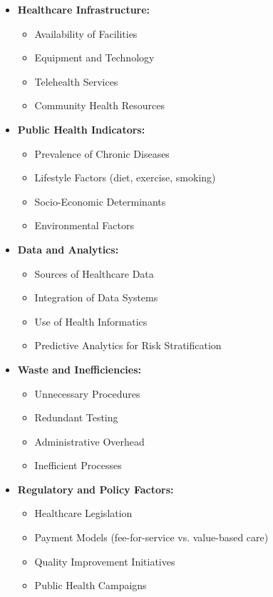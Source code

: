 \documentclass{article}
\begin{document}
\begin{itemize}
    \item \textbf{Healthcare Infrastructure:}
    \begin{itemize}
        \item Availability of Facilities
        \item Equipment and Technology
        \item Telehealth Services
        \item Community Health Resources
    \end{itemize}
    
    \item \textbf{Public Health Indicators:}
    \begin{itemize}
        \item Prevalence of Chronic Diseases
        \item Lifestyle Factors (diet, exercise, smoking)
        \item Socio-Economic Determinants
        \item Environmental Factors
    \end{itemize}
    
    \item \textbf{Data and Analytics:}
    \begin{itemize}
        \item Sources of Healthcare Data
        \item Integration of Data Systems
        \item Use of Health Informatics
        \item Predictive Analytics for Risk Stratification
    \end{itemize}
    
    \item \textbf{Waste and Inefficiencies:}
    \begin{itemize}
        \item Unnecessary Procedures
        \item Redundant Testing
        \item Administrative Overhead
        \item Inefficient Processes
    \end{itemize}
    
    \item \textbf{Regulatory and Policy Factors:}
    \begin{itemize}
        \item Healthcare Legislation
        \item Payment Models (fee-for-service vs. value-based care)
        \item Quality Improvement Initiatives
        \item Public Health Campaigns
    \end{itemize}
\end{itemize}
\end{document}
